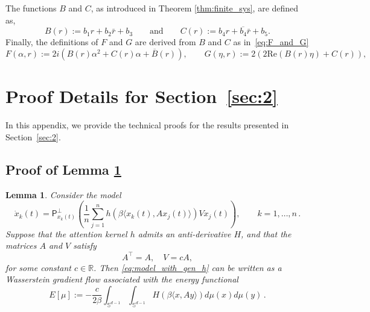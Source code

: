 \documentclass[10pt]{article}
\newtheorem{lemma}[theorem]{Lemma}
\theoremstyle{definition}
\theoremstyle{definition}
\numberwithin{equation}{section}
\newcommand{\R}{\mathbb{R}}
\newcommand{\BBS}{\mathbb{S}}
\newcommand{\re}[1]{\mathrm{Re}\left(#1\right)}
\renewcommand{\P}{\mathsf{P}}
\begin{document}
The functions $B$ and $C$, as introduced in Theorem \ref{thm:finite_sys}, are defined as,
\begin{equation}
    \label{eq:coeff_B_C}
         B(r)
        := b_1 r + b_2 \bar{r} + b_3
        \qquad
        \text{and}
        \qquad
        C(r)
        := b_4 r + \overline{b_4} \bar{r} + b_5.
    \end{equation}
Finally, the definitions of $F$ and $G$ are derived from $B$ and $C$ as in~\eqref{eq:F_and_G}
\begin{equation}
F(\alpha, r) := 2i \left( B(r) \alpha^2 + C (r) \alpha + \overline{B} (r)\right), \qquad G(\eta, r) := 2\left(2 \re{B(r) \eta} + C(r) \right),
\end{equation}



\section{Proof Details for Section~\ref{sec:2}}

In this appendix, we provide the technical proofs for the results presented in Section~\ref{sec:2}.

\subsection{Proof of Lemma \ref{lem:model_gen_h_WGF}}
\begin{lemma}\label{lem:model_gen_h_WGF}
Consider the model
\begin{equation}\label{eq:model_with_gen_h}
    \Dot{x}_k(t) = \P^{\perp}_{x_k(t)} \left( \frac{1}{n} \sum_{j=1}^n h(\beta \langle x_k(t), A x_j(t) \rangle) V x_j(t) \right), \qquad k=1, \dots, n \, .
\end{equation}
Suppose that the attention kernel $h$ admits an anti-derivative $H$, and that the matrices $A$ and $V$ satisfy
\begin{equation*}
    A^{\top} = A, \quad V = cA,
\end{equation*}
for some constant $c \in \R$.
Then \eqref{eq:model_with_gen_h} can be written as a Wasserstein gradient flow associated with the energy functional
\begin{equation*}
    E[\mu] := -\frac{c}{2\beta}\int_{\BBS^{d-1}} \int_{\BBS^{d-1}} H(\beta \langle x, A y \rangle) d\mu(x) d\mu(y) \, .
\end{equation*}
\end{lemma}
\end{document}
